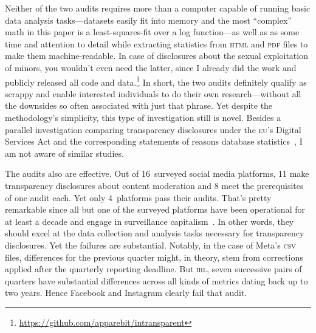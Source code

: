 \documentclass[nonacm,screen]{acmart}
\newcommand\V[1]{\textsc{\MakeLowercase{#1}}}
\begin{document}
Neither of the two audits requires more than a computer capable of running basic
data analysis tasks---datasets easily fit into memory and the most ``complex''
math in this paper is a least-squares-fit over a log function---as well as as
some time and attention to detail while extracting statistics from \V{HTML} and
\V{PDF} files to make them machine-readable. In case of disclosures about the
sexual exploitation of minors, you wouldn't even need the latter, since I
already did the work and publicly released all code and
data.\footnote{\label{fn:intransparent}\url{https://github.com/apparebit/intransparent}}
In short, the two audits definitely qualify as scrappy and enable interested
individuals to do their own research---without all the downsides so often
associated with just that phrase. Yet despite the methodology's simplicity, this
type of investigation still is novel. Besides a parallel investigation comparing
transparency disclosures under the \V{EU}'s Digital Services Act and the
corresponding statements of reasons database
statistics~\cite{TrujilloFagniea2024}, I am not aware of similar studies.

The audits also are effective. Out of 16~surveyed social media platforms, 11
make transparency disclosures about content moderation and 8 meet the
prerequisites of one audit each. Yet only 4~platforms pass their audits. That's
pretty remarkable since all but one of the surveyed platforms have been
operational for at least a decade and engage in surveillance
capitalism~\cite{Zuboff2019}. In other words, they should excel at the data
collection and analysis tasks necessary for transparency disclosures. Yet the
failures are substantial. Notably, in the case of Meta's \V{CSV} files,
differences for the previous quarter might, in theory, stem from corrections
applied after the quarterly reporting deadline. But \V{IRL}, seven successive
pairs of quarters have substantial differences across all kinds of metrics
dating back up to two years. Hence Facebook and Instagram clearly fail that
audit.
\end{document}
